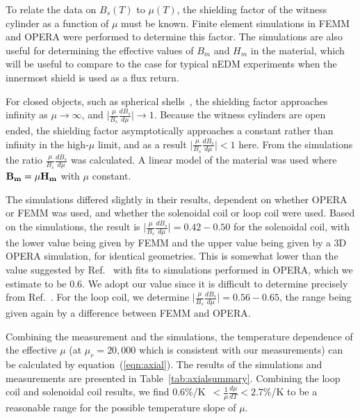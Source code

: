 To relate the data on $B_s(T)$ to $\mu(T)$, the shielding factor of
the witness cylinder as a function of $\mu$ must be known.  Finite
element simulations in FEMM and OPERA were performed to determine this
factor.  The simulations are also useful for determining the effective
values of $B_m$ and $H_m$ in the material, which will be useful to
compare to the case for typical nEDM experiments when the innermost
shield is used as a flux return.

For closed objects, such as spherical
shells~\cite{bib:bidinostimartin,bib:urankar}, the shielding factor
approaches infinity as $\mu \rightarrow \infty$, and
$\vert\frac{\mu}{B_s}\frac{dB_s}{d\mu}\vert\rightarrow 1$.  Because
the witness cylinders are open ended, the shielding factor
asymptotically approaches a constant rather than infinity in the
high-$\mu$ limit, and as a result
$\vert\frac{\mu}{B_s}\frac{dB_s}{d\mu}\vert<1$ here.  From the
simulations the ratio $\frac{\mu}{B_s}\frac{dB_s}{d\mu}$ was
calculated.  A linear model of the material was used where
$\bold{B_m}=\mu\bold{H_m}$ with $\mu$ constant.


The simulations differed slightly in their results, dependent on
whether OPERA or FEMM was used, and whether the solenoidal coil or
loop coil were used.  Based on the simulations, the result is
$\vert\frac{\mu}{B_s}\frac{dB_s}{d\mu}\vert=0.42-0.50$ for the
solenoidal coil, with the lower value being given by FEMM and the
upper value being given by a 3D OPERA simulation, for identical
geometries.  This is somewhat lower than the value suggested by
Ref.~\cite{bib:paperno-open-ended} with fits to simulations performed
in OPERA, which we estimate to be 0.6.  We adopt our value since it is
difficult to determine precisely from
Ref.~\cite{bib:paperno-open-ended}.  For the loop coil, we determine
$\vert\frac{\mu}{B_s}\frac{dB_s}{d\mu}\vert=0.56-0.65$, the range
being given again by a difference between FEMM and OPERA.

Combining the measurement and the simulations, the temperature
dependence of the effective $\mu$ (at $\mu_r=20,000$ which is
consistent with our measurements) can be calculated by
equation~(\ref{eqn:axial}).  The results of the simulations and
measurements are presented in Table~\ref{tab:axialsummary}.  Combining
the loop coil and solenoidal coil results, we find
0.6\%/K~$<\frac{1}{\mu}\frac{d\mu}{dT}<2.7\%$/K to be a reasonable
range for the possible temperature slope of $\mu$.


